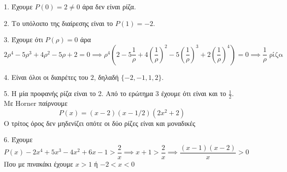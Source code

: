 \documentclass[12pt]{article}
\begin{document}
\begin{enumerate}
 \item[1.] Έχουμε $P(0)=2 \ne 0$ άρα δεν είναι ρίζα.
 \item[2.] Το υπόλοιπο της διαίρεσης είναι το $P(1)=-2$.
 \item[3.] Έχουμε ότι $P(ρ)=0$ άρα
 $$2ρ^4-5ρ^3+4ρ^2-5ρ+2=0 \implies ρ^4(2-5\frac{1}{ρ}+4(\frac{1}{ρ})^2-5(\frac{1}{ρ})^3+2(\frac{1}{ρ})^4)=0\implies \frac{1}{ρ} \text{ ρίζα}$$
 \item[4.] Είναι όλοι οι διαιρέτες του $2$, δηλαδή $\{-2,-1,1,2\}$.
 \item[5.] Η μία προφανής ρίζα είναι το 2. Από το ερώτημα 3 έχουμε ότι είναι και το $\frac{1}{2}$. Με Horner παίρνουμε
 $$P(x)=(x-2)(x-1/2)(2x^2+2)$$
 Ο τρίτος όρος δεν μηδενίζει οπότε οι δύο ρίζες είναι και μοναδικές
 \item[6.] Έχουμε
 $$P(x)-2x^4+5x^3-4x^2+6x-1>\frac{2}{x} \implies x+1>\frac{2}{x} \implies \frac{(x-1)(x-2)}{x}>0$$
 Που με πινακάκι έχουμε $x>1$ ή $-2<x<0$
\end{enumerate}
\end{document}
